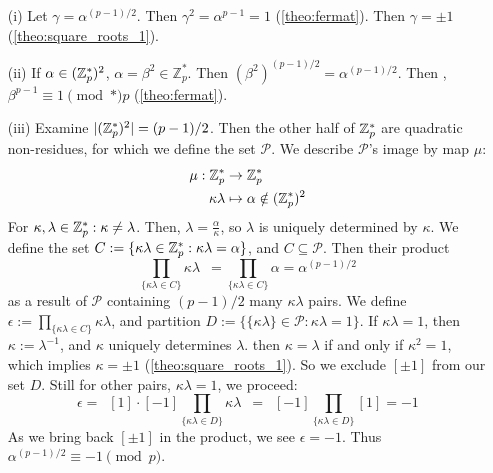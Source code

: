 \begin{Proof}

    \begin{enumerate}
        \item [(i)] Let $\gamma=\alpha^{(p-1)/2}$. Then $\gamma^2=\alpha^{p-1}=1$ (\ref{theo:fermat}). Then $\gamma=\pm1$ (\ref{theo:square_roots_1}).
        \item[(ii)] If $\alpha\in(\mathbb{Z}_p^*)^2$, $\alpha=\beta^2\in\mathbb{Z}_p^*$. Then $(\beta^2)^{(p-1)/2}=\alpha^{(p-1)/2}$.
        Then , $\beta^{p-1}\equiv 1 \pmod*{p}$ (\ref{theo:fermat}).
        \item[(iii)] Examine $|(\mathbb{Z}_p^*)^2|=(p-1)/2$. Then the other half of $\mathbb{Z}_p^*$ are quadratic non-residues, for which we define the set $\mathcal{P}$.
                     We describe $\mathcal{P}$'s image by map $\mu$:
                        \begin{align*}
                            \mu: \mathbb{Z}_p^* &\to \mathbb{Z}_p^*\\
                            \kappa\lambda &\mapsto \alpha\notin(\mathbb{Z}_p^*)^2
                        \end{align*}
                        For $\kappa,\lambda\in\mathbb{Z}_p^*:\kappa\neq\lambda$. Then, $\lambda=\frac{\alpha}{\kappa}$, so $\lambda$ is uniquely determined by $\kappa$.
                        We define the set $C:=\{\kappa\lambda\in\mathbb{Z}_p^*:\kappa\lambda=\alpha\}$, and $C\subseteq\mathcal{P}$. Then their product
                        \[\prod_{\{\kappa\lambda\in C\}}\kappa\lambda\enspace=\prod_{\{\kappa\lambda\in C\}}\alpha=\alpha^{(p-1)/2}\]
                        as a result of $\mathcal{P}$ containing $(p-1)/2$ many $\kappa\lambda$ pairs. We define $\epsilon:=\prod_{\{\kappa\lambda\in C\}}\kappa\lambda$,
                        and partition $D:=\{\{\kappa\lambda\}\in\mathcal{P}:\kappa\lambda=1\}$. If $\kappa\lambda=1$, then $\kappa:=\lambda^{-1}$, and $\kappa$ uniquely determines $\lambda$.
                        then $\kappa=\lambda$ if and only if $\kappa^2=1$, which implies $\kappa=\pm1$ (\ref{theo:square_roots_1}). So we exclude $[\pm1]$ from our set $D$. Still for other pairs, $\kappa\lambda=1$, we proceed:
                        \[\epsilon=\enspace[1]\cdot[-1]\prod_{\{\kappa\lambda\in D\}}\kappa\lambda\enspace=\enspace[-1]\prod_{\{\kappa\lambda\in D\}}[1]=-1\]
                        As we bring back $[\pm1]$ in the product, we see $\epsilon=-1$. Thus $\alpha^{(p-1)/2}\equiv -1\pmod{p}$.
    \end{enumerate} 

\end{Proof}
